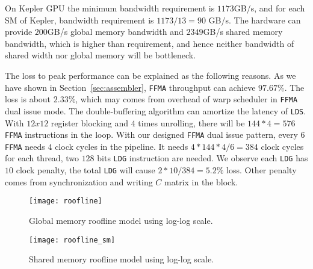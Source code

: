 On Kepler GPU the minimum bandwidth requirement is $1173$GB/s, and for each SM of Kepler, bandwidth requirement is
$1173/13=90$ GB/s.
The hardware can provide $200$GB/s global memory bandwidth and $2349$GB/s shared memory bandwidth, which is
higher than requirement, and hence neither bandwidth of shared width nor global memory will be bottleneck.

The loss to peak performance can be explained as the following reasons. As we have shown in 
Section~\ref{sec:assembler}, {\tt FFMA} throughput can achieve $97.67\%$. The loss is about $2.33\%$, which may comes 
from overhead of warp scheduler in {\tt FFMA} dual issue mode. The double-buffering algorithm can amortize the latency 
of {\tt LDS}.
With $12x12$ register blocking and $4$ times unrolling, there will be $144*4=576$ {\tt FFMA} instructions in the loop.
With our designed {\tt FFMA} dual issue pattern, every $6$ {\tt FFMA} needs $4$ clock cycles in the pipeline.
It needs $4*144*4/6=384$ clock cycles for each thread,  two $128$ bits {\tt LDG} instruction are needed.
We observe each {\tt LDG} has $10$ clock penalty, the total {\tt LDG} will cause $2*10/384 = 5.2\%$ loss. Other penalty 
comes from synchronization and writing $C$ matrix in the block.


\begin{figure}[htbp]
\begin{center}
\texttt{[image: roofline]}
    \caption{Global memory roofline model using log-log scale.}
\label{fig:roofline}
\end{center}
\end{figure}


\begin{figure}[htbp]
\begin{center}
\texttt{[image: roofline\_sm]}
    \caption{Shared memory roofline model using log-log scale.}
\label{fig:roofline}
\end{center}
\end{figure}
